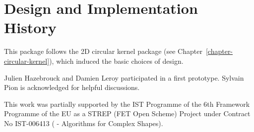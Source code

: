 
\section{Design and Implementation History}

This package follows the 2D circular kernel package (see
Chapter~\ref{chapter-circular-kernel}), which induced the basic
choices of design.

Julien Hazebrouck and Damien Leroy participated in a first
prototype. Sylvain Pion is acknowledged for helpful discussions.

This work was partially supported by the IST Programme of the 6th
Framework Programme of the EU as a STREP (FET Open Scheme) Project
under Contract No IST-006413 ( -
Algorithms for Complex Shapes).
